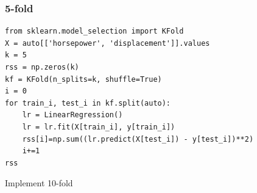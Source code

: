 

\begin{frame}[fragile]\frametitle{5-fold}
\tiny
\begin{lstlisting}
from sklearn.model_selection import KFold
X = auto[['horsepower', 'displacement']].values
k = 5
rss = np.zeros(k)
kf = KFold(n_splits=k, shuffle=True)
i = 0
for train_i, test_i in kf.split(auto):
    lr = LinearRegression() 
    lr = lr.fit(X[train_i], y[train_i])
    rss[i]=np.sum((lr.predict(X[test_i]) - y[test_i])**2)
    i+=1
rss
\end{lstlisting}
\end{frame}

\begin{frame}[fragile]
Implement 10-fold
\end{frame}







%
%
%
%


